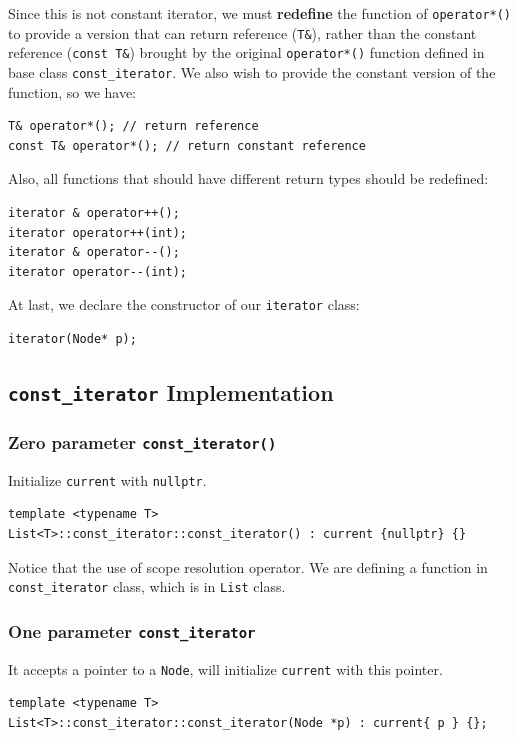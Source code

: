 \documentclass[12pt]{book}
\begin{document}
Since this is not constant iterator, we must \textbf{redefine} the function of \texttt{operator*()} to provide a version that can return reference (\texttt{T\&}), rather than the constant reference (\texttt{const T\&}) brought by the original \texttt{operator*()} function defined in base class \texttt{const\_iterator}. We also wish to provide the constant version of the function, so we have:
\begin{verbatim}
T& operator*(); // return reference
const T& operator*(); // return constant reference
\end{verbatim}

Also, all functions that should have different return types should be redefined:
\begin{verbatim}
iterator & operator++();
iterator operator++(int);
iterator & operator--();
iterator operator--(int);
\end{verbatim}

At last, we declare the constructor of our \texttt{iterator} class:
\begin{verbatim}
iterator(Node* p);
\end{verbatim}
\subsection{\texttt{const\_iterator} Implementation}
\label{sec:orgac88cd9}
\subsubsection{Zero parameter \texttt{const\_iterator()}}
\label{sec:org58afcb4}
Initialize \texttt{current} with \texttt{nullptr}.
\begin{verbatim}
template <typename T>
List<T>::const_iterator::const_iterator() : current {nullptr} {}
\end{verbatim}

Notice that the use of scope resolution operator. We are defining a function in \texttt{const\_iterator} class, which is in \texttt{List} class.
\subsubsection{One parameter \texttt{const\_iterator}}
\label{sec:org489ea41}
It accepts a pointer to a \texttt{Node}, will initialize \texttt{current} with this pointer.
\begin{verbatim}
template <typename T>
List<T>::const_iterator::const_iterator(Node *p) : current{ p } {};
\end{verbatim}
\end{document}
